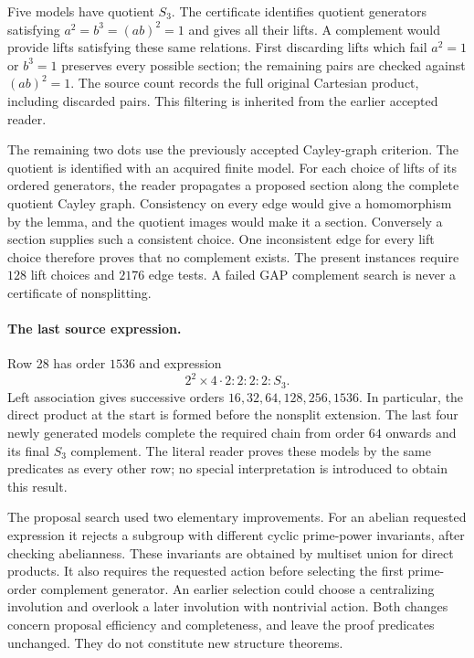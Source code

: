 \documentclass[11pt]{article}
\begin{document}
Five models have quotient $S_3$. The certificate identifies quotient
generators satisfying $a^2=b^3=(ab)^2=1$ and gives all their lifts. A
complement would provide lifts satisfying these same relations. First
discarding lifts which fail $a^2=1$ or $b^3=1$ preserves every possible
section; the remaining pairs are checked against $(ab)^2=1$. The source
count records the full original Cartesian product, including discarded
pairs. This filtering is inherited from the earlier accepted reader.

The remaining two dots use the previously accepted Cayley-graph criterion.
The quotient is identified with an acquired finite model. For each choice
of lifts of its ordered generators, the reader propagates a proposed
section along the complete quotient Cayley graph. Consistency on every
edge would give a homomorphism by the lemma, and the quotient images would
make it a section. Conversely a section supplies such a consistent choice.
One inconsistent edge for every lift choice therefore proves that no
complement exists. The present instances require $128$ lift choices and
$2176$ edge tests. A failed GAP complement search is never a certificate
of nonsplitting.

\paragraph{The last source expression.}
Row 28 has order $1536$ and expression
\[
  2^2\times4\mathbin{\cdot}2:2:2:2:S_3.
\]
Left association gives successive orders
$16,32,64,128,256,1536$. In particular, the direct product at the start
is formed before the nonsplit extension. The last four newly generated
models complete the required chain from order $64$ onwards and its final
$S_3$ complement. The literal reader proves these models by the same
predicates as every other row; no special interpretation is introduced
to obtain this result.

The proposal search used two elementary improvements. For an abelian
requested expression it rejects a subgroup with different cyclic
prime-power invariants, after checking abelianness. These invariants are
obtained by multiset union for direct products. It also requires the
requested action before selecting the first prime-order complement
generator. An earlier selection could choose a centralizing involution
and overlook a later involution with nontrivial action. Both changes
concern proposal efficiency and completeness, and leave the proof
predicates unchanged. They do not constitute new structure theorems.
\end{document}
